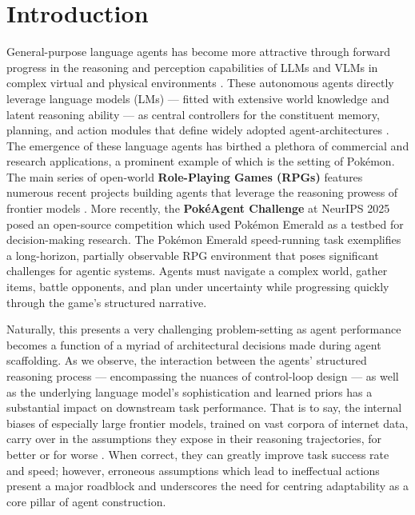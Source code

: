 \documentclass[11pt]{article}
\begin{document}
\section{Introduction}
General-purpose language agents has become more attractive through forward progress in the reasoning and perception capabilities of LLMs and VLMs in complex virtual and physical environments \citep{zheng2024steveeye}. These autonomous agents directly leverage language models (LMs) --- fitted with extensive world knowledge and latent reasoning ability --- as central controllers for the constituent memory, planning, and action modules that define widely adopted agent-architectures \citep{wang2024survey}. The emergence of these language agents has birthed a plethora of commercial and research applications, a prominent example of which is the setting of Pokémon. The main series of open-world \textbf{Role-Playing Games (RPGs)} features numerous recent projects building agents that leverage the reasoning prowess of frontier models \citep{claude2025twitch, gpt2025crystal, zhang2025gemini}. More recently, the \textbf{PokéAgent Challenge} at NeurIPS 2025 posed an open-source competition which used Pokémon Emerald as a testbed for decision-making research. The Pokémon Emerald speed-running task exemplifies a long-horizon, partially observable RPG environment that poses significant challenges for agentic systems. Agents must navigate a complex world, gather items, battle opponents, and plan under uncertainty while progressing quickly through the game's structured narrative.

Naturally, this presents a very challenging problem-setting as agent performance becomes a function of a myriad of architectural decisions made during agent scaffolding. As we observe, the interaction between the agents' structured reasoning process --- encompassing the nuances of control-loop design --- as well as the underlying language model's sophistication and learned priors has a substantial impact on downstream task performance. That is to say, the internal biases of especially large frontier models, trained on vast corpora of internet data, carry over in the assumptions they expose in their reasoning trajectories, for better or for worse \citep{song2024grace, tan2024agentsynth, zhao2024llmjudgefailures}. When correct, they can greatly improve task success rate and speed; however, erroneous assumptions which lead to ineffectual actions present a major roadblock and underscores the need for centring adaptability as a core pillar of agent construction. %
\end{document}
